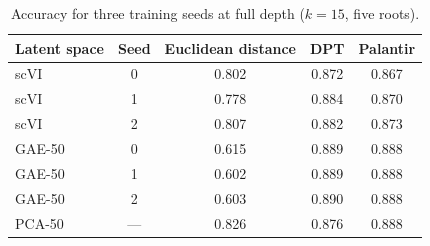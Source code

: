 \documentclass[10pt,a4paper,twocolumn]{article}
\begin{document}
\begin{table}[t]
\centering\small
\caption{Accuracy for three training seeds at full depth ($k=15$, five roots).}
\label{tab:seeds}
\begin{tabular}{lcccc}
\toprule
Latent space & Seed & Euclidean distance & DPT & Palantir \\
\midrule
scVI & 0 & 0.802 & 0.872 & 0.867 \\
scVI & 1 & 0.778 & 0.884 & 0.870 \\
scVI & 2 & 0.807 & 0.882 & 0.873 \\
\midrule
GAE-50 & 0 & 0.615 & 0.889 & 0.888 \\
GAE-50 & 1 & 0.602 & 0.889 & 0.888 \\
GAE-50 & 2 & 0.603 & 0.890 & 0.888 \\
\midrule
PCA-50 & --- & 0.826 & 0.876 & 0.888 \\
\bottomrule
\end{tabular}
\end{table}
\end{document}
